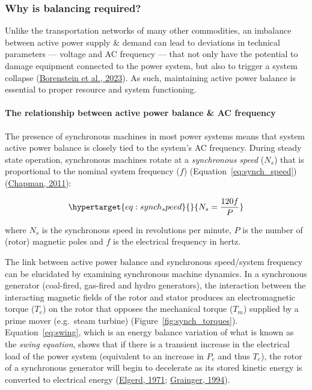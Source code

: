 \documentclass[12pt,a4paper,]{report}
\begin{document}
\hypertarget{sec:lit_review-balancing_need}{%
\subsubsection{Why is balancing
required?}\label{sec:lit_review-balancing_need}}

Unlike the transportation networks of many other commodities, an
imbalance between active power supply \& demand can lead to deviations
in technical parameters --- voltage and AC frequency --- that not only
have the potential to damage equipment connected to the power system,
but also to trigger a system collapse
(\protect\hyperlink{ref-borensteinEconomicsElectricityReliability2023}{Borenstein
et al., 2023}). As such, maintaining active power balance is essential
to proper resource and system functioning.

\hypertarget{sec:lit_review-balancing_need-frequency}{%
\paragraph{The relationship between active power balance \& AC
frequency}\label{sec:lit_review-balancing_need-frequency}}

The presence of synchronous machines in most power systems means that
system active power balance is closely tied to the system's AC
frequency. During steady state operation, synchronous machines rotate at
a \emph{synchronous speed} (\(N_s\)) that is proportional to the nominal
system frequency (\(f\)) (Equation~\ref{eq:synch_speed})
(\protect\hyperlink{ref-chapmanElectricMachineryFundamentals2011}{Chapman,
2011}):

\begin{equation}\protect\hypertarget{eq:synch_speed}{}{N_s = \frac{120f}{P}}\label{eq:synch_speed}\end{equation}

where \(N_s\) is the synchronous speed in revolutions per minute, \(P\)
is the number of (rotor) magnetic poles and \(f\) is the electrical
frequency in hertz.

The link between active power balance and synchronous speed/system
frequency can be elucidated by examining synchronous machine dynamics.
In a synchronous generator (coal-fired, gas-fired and hydro generators),
the interaction between the interacting magnetic fields of the rotor and
stator produces an electromagnetic torque (\(T_e\)) on the rotor that
opposes the mechanical torque (\(T_m\)) supplied by a prime mover
(e.g.~steam turbine) (Figure~\ref{fig:synch_torques}).
Equation~\ref{eq:swing}, which is an energy balance variation of what is
known as the \emph{swing equation}, shows that if there is a transient
increase in the electrical load of the power system (equivalent to an
increase in \(P_e\) and thus \(T_e\)), the rotor of a synchronous
generator will begin to decelerate as its stored kinetic energy is
converted to electrical energy
(\protect\hyperlink{ref-elgerdElectricEnergySystems1971}{Elgerd, 1971};
\protect\hyperlink{ref-graingerPowerSystemAnalysis1994}{Grainger,
1994}).
\end{document}

